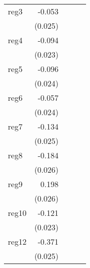 {\begin{longtable}{l*{4}{D{.}{.}{-1}}}
\addlinespace
reg3        &      -0.053\sym{*}  &                     &                     &                     \\
            &     (0.025)         &                     &                     &                     \\
\addlinespace
reg4        &      -0.094\sym{***}&                     &                     &                     \\
            &     (0.023)         &                     &                     &                     \\
\addlinespace
reg5        &      -0.096\sym{***}&                     &                     &                     \\
            &     (0.024)         &                     &                     &                     \\
\addlinespace
reg6        &      -0.057\sym{*}  &                     &                     &                     \\
            &     (0.024)         &                     &                     &                     \\
\addlinespace
reg7        &      -0.134\sym{***}&                     &                     &                     \\
            &     (0.025)         &                     &                     &                     \\
\addlinespace
reg8        &      -0.184\sym{***}&                     &                     &                     \\
            &     (0.026)         &                     &                     &                     \\
\addlinespace
reg9        &       0.198\sym{***}&                     &                     &                     \\
            &     (0.026)         &                     &                     &                     \\
\addlinespace
reg10       &      -0.121\sym{***}&                     &                     &                     \\
            &     (0.023)         &                     &                     &                     \\
\addlinespace
reg12       &      -0.371\sym{***}&                     &                     &                     \\
            &     (0.025)         &                     &                     &                     \\

\end{longtable}}
